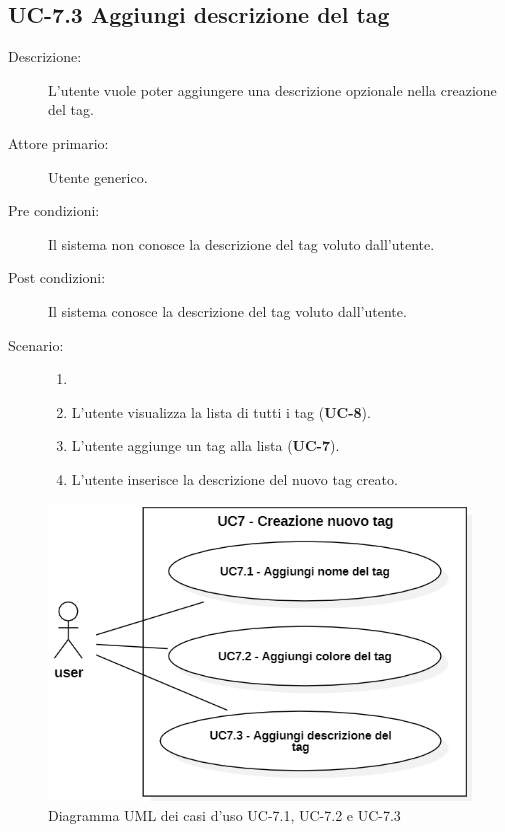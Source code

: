 \subsection{UC-7.3 Aggiungi descrizione del tag}
\begin{description}
    \item[Descrizione:] L’utente vuole poter aggiungere una descrizione opzionale nella creazione del tag.
    \item[Attore primario:] Utente generico.
    \item[Pre condizioni:] Il sistema non conosce la descrizione  del tag voluto dall’utente.
    \item[Post condizioni:] Il sistema conosce la descrizione del tag voluto dall’utente.
    \item[Scenario:]
    \begin{enumerate}
        \item[]
        \item L’utente visualizza la lista di tutti i tag (\textbf{UC-8}).
        \item L'utente aggiunge un tag alla lista (\textbf{UC-7}).
        \item L'utente inserisce la descrizione del nuovo tag creato.
    \end{enumerate}
\end{description}
\begin{figure}[H]
    \centering
    \includegraphics[width=0.8\linewidth]{UC7.1.PNG} 
    \caption{Diagramma UML dei casi d'uso UC-7.1, UC-7.2 e UC-7.3}
    \label{fig:UC7.1-2-3}
\end{figure}

